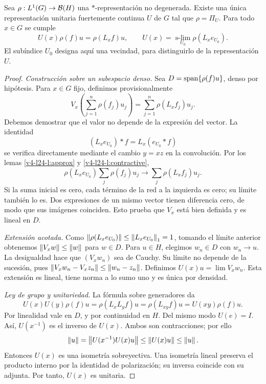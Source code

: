 \begin{teorema}\label{v4-l24-t:inverse}
Sea $\rho:L^1(G)\to\mathcal B(H)$ una $*$-representación no degenerada. Existe una única representación unitaria fuertemente continua $U$ de $G$ tal que $\rho=\Pi_U$. Para todo $x\in G$ se cumple
\begin{equation}\label{v4-l24-eq:reconstruct}
U(x)\rho(f)u=\rho(L_xf)u,
\qquad
U(x)=\operatorname*{s-lim}_{U_0}\rho(L_xe_{U_0}).
\end{equation}
El subíndice $U_0$ designa aquí una vecindad, para distinguirlo de la representación $U$.
\end{teorema}
\begin{proof}
\textit{Construcción sobre un subespacio denso.} Sea $D=\operatorname{span}\{\rho(f)u\}$, denso por hipótesis. Para $x\in G$ fijo, definimos provisionalmente
\[
V_x\left(\sum_{j=1}^n\rho(f_j)u_j\right)
=\sum_{j=1}^n\rho(L_xf_j)u_j.
\]
Debemos demostrar que el valor no depende de la expresión del vector. La identidad
\[
(L_xe_{U_0})*f=L_x(e_{U_0}*f)
\]
se verifica directamente mediante el cambio $y=xz$ en la convolución. Por los lemas \ref{v4-l24-l:approx} y \ref{v4-l24-l:contractive},
\[
\rho(L_xe_{U_0})\sum_j\rho(f_j)u_j
\longrightarrow\sum_j\rho(L_xf_j)u_j.
\]
Si la suma inicial es cero, cada término de la red a la izquierda es cero; su límite también lo es. Dos expresiones de un mismo vector tienen diferencia cero, de modo que sus imágenes coinciden. Esto prueba que $V_x$ está bien definida y es lineal en $D$.

\textit{Extensión acotada.} Como $\left\lVert\rho(L_xe_{U_0})\right\rVert\leq\left\lVert L_xe_{U_0}\right\rVert_1=1$, tomando el límite anterior obtenemos $\left\lVert V_xw\right\rVert\leq\left\lVert w\right\rVert$ para $w\in D$. Para $u\in H$, elegimos $w_n\in D$ con $w_n\to u$. La desigualdad hace que $(V_xw_n)$ sea de Cauchy. Su límite no depende de la sucesión, pues $\left\lVert V_xw_n-V_xz_n\right\rVert\leq\left\lVert w_n-z_n\right\rVert$. Definimos $U(x)u=\lim V_xw_n$. Esta extensión es lineal, tiene norma a lo sumo uno y es única por densidad.

\textit{Ley de grupo y unitariedad.} La fórmula sobre generadores da
\[
U(x)U(y)\rho(f)u=\rho(L_xL_yf)u
=\rho(L_{xy}f)u=U(xy)\rho(f)u.
\]
Por linealidad vale en $D$, y por continuidad en $H$. Del mismo modo $U(e)=I$. Así, $U(x^{-1})$ es el inverso de $U(x)$. Ambos son contracciones; por ello
\[
\left\lVert u\right\rVert=\left\lVert U(x^{-1})U(x)u\right\rVert\leq\left\lVert U(x)u\right\rVert\leq\left\lVert u\right\rVert.
\]
Entonces $U(x)$ es una isometría sobreyectiva. Una isometría lineal preserva el producto interno por la identidad de polarización; su inversa coincide con su adjunta. Por tanto, $U(x)$ es unitaria.


\end{proof}

